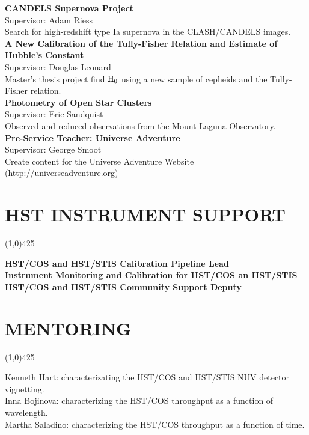 \documentclass{res}
\begin{document}
\begin{resume}
{\bf CANDELS Supernova Project}\hspace{116pt}\\
\hspace*{24pt}Supervisor: Adam Riess \\
\hspace*{24pt}Search for high-redshift type Ia supernova in the CLASH/CANDELS images.\\
{\bf  A New Calibration of the Tully-Fisher Relation and Estimate of Hubble's Constant} \\ %
\hspace*{24pt}Supervisor: Douglas Leonard\\
\hspace*{24pt}Master's thesis project find $\rm{H_0}$ using a new sample of cepheids and the Tully-Fisher relation.   \\
{\bf Photometry of Open Star Clusters } \hspace{87pt}\\
\hspace*{24pt}Supervisor: Eric Sandquist\\
\hspace*{24pt}Observed and reduced observations from the Mount Laguna Observatory. \\ 
{\bf Pre-Service Teacher: Universe Adventure} \hspace{56pt}\\
\hspace*{24pt}Supervisor: George Smoot \\
\hspace*{24pt}Create content for the Universe Adventure Website ({\color{blue}\url{http://universeadventure.org}}) 
%
\section{HST INSTRUMENT SUPPORT} 
\vspace{-.2in}
\begin{center}
\line(1,0){425}
\end{center}
\vspace{-.3in}
\vspace{0.1in}
{\bf HST/COS and HST/STIS Calibration Pipeline Lead} \\
{\bf Instrument Monitoring and Calibration for HST/COS an HST/STIS} \\
{\bf HST/COS and HST/STIS Community Support Deputy} 
%
\section{MENTORING} 
\vspace{-.2in}
\begin{center}
\line(1,0){425}
\end{center}
\vspace{-.3in}
\vspace{0.1in}
Kenneth Hart: characterizating the HST/COS and HST/STIS NUV detector vignetting. \\
Inna Bojinova: characterizing the HST/COS throughput as a function of wavelength. \\
Martha Saladino: characterizing the HST/COS throughput as a function of time. 
%

\end{resume}
\end{document}
